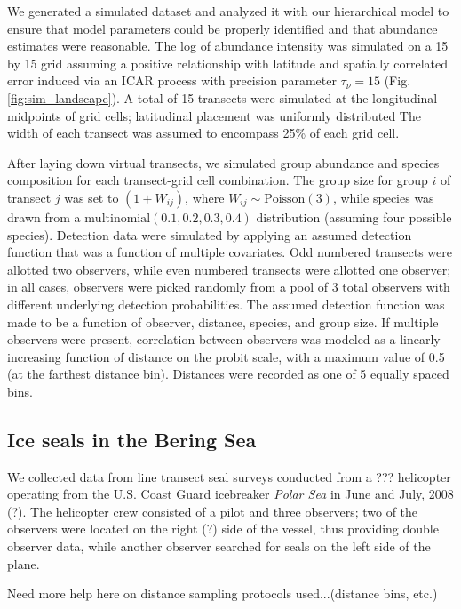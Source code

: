 \documentclass[10pt]{article}
\begin{document}
We generated a simulated dataset and analyzed it with our hierarchical model to ensure that model parameters could be properly identified and that abundance estimates were reasonable.  The log of abundance intensity was simulated on a 15 by 15 grid assuming a positive relationship with latitude and spatially correlated error induced via an ICAR process with precision parameter $\tau_\nu=15$ (Fig. \ref{fig:sim_landscape}).  A total of 15 transects were simulated at the longitudinal midpoints of grid cells; latitudinal placement was uniformly distributed   The width of each transect was assumed to encompass 25\% of each grid cell.

After laying down virtual transects, we simulated group abundance and species composition for each transect-grid cell combination.  The group size for group $i$ of transect $j$ was set to $(1+W_{ij})$, where $W_{ij} \sim \textrm{Poisson}(3)$, while species was drawn from a $\textrm{multinomial}(0.1,0.2,0.3,0.4)$ distribution (assuming four possible species).
Detection data were simulated by applying an assumed detection function that was a function of multiple covariates.  Odd numbered transects were allotted two observers, while even numbered transects were allotted one observer; in all cases, observers were picked randomly from a pool of 3 total observers with different underlying detection probabilities.  The assumed detection function was made to be a function of observer, distance, species, and group size.  If multiple observers were present, correlation between observers was modeled as a linearly increasing function of distance on the probit scale, with a maximum value of 0.5 (at the farthest distance bin).  Distances were recorded as one of 5 equally spaced bins.

\subsection*{Ice seals in the Bering Sea}

We collected data from line transect seal surveys conducted from a ??? helicopter operating from the U.S. Coast Guard icebreaker {\it Polar Sea} in June and July, 2008 (?).  The helicopter crew consisted of a pilot and three observers; two of the observers were located on the right (?) side of the vessel, thus providing double observer data, while another observer searched for seals on the left side of the plane.

Need more help here on distance sampling protocols used...(distance bins, etc.)
\end{document}
